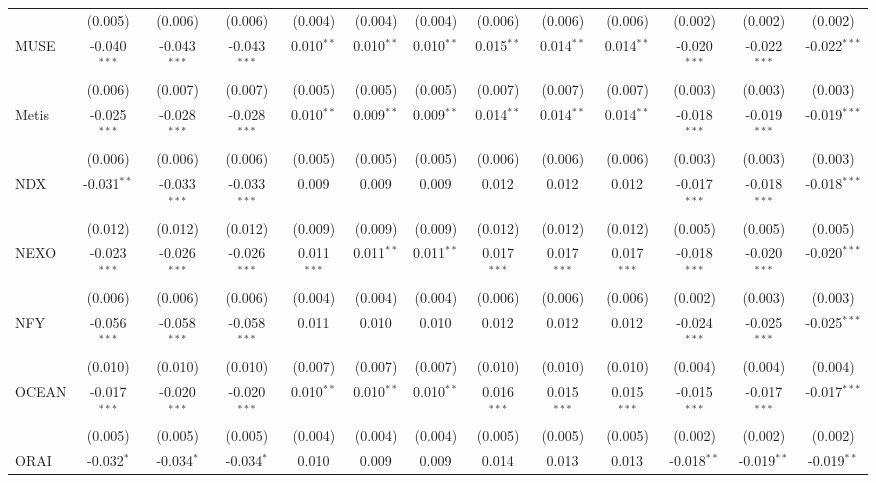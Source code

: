 \begin{table}[!htbp]
\begin{tabular}{@{\extracolsep{5pt}}lcccccccccccc}
  & (0.005) & (0.006) & (0.006) & (0.004) & (0.004) & (0.004) & (0.006) & (0.006) & (0.006) & (0.002) & (0.002) & (0.002) \\
 MUSE & -0.040$^{***}$ & -0.043$^{***}$ & -0.043$^{***}$ & 0.010$^{**}$ & 0.010$^{**}$ & 0.010$^{**}$ & 0.015$^{**}$ & 0.014$^{**}$ & 0.014$^{**}$ & -0.020$^{***}$ & -0.022$^{***}$ & -0.022$^{***}$ \\
  & (0.006) & (0.007) & (0.007) & (0.005) & (0.005) & (0.005) & (0.007) & (0.007) & (0.007) & (0.003) & (0.003) & (0.003) \\
 Metis & -0.025$^{***}$ & -0.028$^{***}$ & -0.028$^{***}$ & 0.010$^{**}$ & 0.009$^{**}$ & 0.009$^{**}$ & 0.014$^{**}$ & 0.014$^{**}$ & 0.014$^{**}$ & -0.018$^{***}$ & -0.019$^{***}$ & -0.019$^{***}$ \\
  & (0.006) & (0.006) & (0.006) & (0.005) & (0.005) & (0.005) & (0.006) & (0.006) & (0.006) & (0.003) & (0.003) & (0.003) \\
 NDX & -0.031$^{**}$ & -0.033$^{***}$ & -0.033$^{***}$ & 0.009$^{}$ & 0.009$^{}$ & 0.009$^{}$ & 0.012$^{}$ & 0.012$^{}$ & 0.012$^{}$ & -0.017$^{***}$ & -0.018$^{***}$ & -0.018$^{***}$ \\
  & (0.012) & (0.012) & (0.012) & (0.009) & (0.009) & (0.009) & (0.012) & (0.012) & (0.012) & (0.005) & (0.005) & (0.005) \\
 NEXO & -0.023$^{***}$ & -0.026$^{***}$ & -0.026$^{***}$ & 0.011$^{***}$ & 0.011$^{**}$ & 0.011$^{**}$ & 0.017$^{***}$ & 0.017$^{***}$ & 0.017$^{***}$ & -0.018$^{***}$ & -0.020$^{***}$ & -0.020$^{***}$ \\
  & (0.006) & (0.006) & (0.006) & (0.004) & (0.004) & (0.004) & (0.006) & (0.006) & (0.006) & (0.002) & (0.003) & (0.003) \\
 NFY & -0.056$^{***}$ & -0.058$^{***}$ & -0.058$^{***}$ & 0.011$^{}$ & 0.010$^{}$ & 0.010$^{}$ & 0.012$^{}$ & 0.012$^{}$ & 0.012$^{}$ & -0.024$^{***}$ & -0.025$^{***}$ & -0.025$^{***}$ \\
  & (0.010) & (0.010) & (0.010) & (0.007) & (0.007) & (0.007) & (0.010) & (0.010) & (0.010) & (0.004) & (0.004) & (0.004) \\
 OCEAN & -0.017$^{***}$ & -0.020$^{***}$ & -0.020$^{***}$ & 0.010$^{**}$ & 0.010$^{**}$ & 0.010$^{**}$ & 0.016$^{***}$ & 0.015$^{***}$ & 0.015$^{***}$ & -0.015$^{***}$ & -0.017$^{***}$ & -0.017$^{***}$ \\
  & (0.005) & (0.005) & (0.005) & (0.004) & (0.004) & (0.004) & (0.005) & (0.005) & (0.005) & (0.002) & (0.002) & (0.002) \\
 ORAI & -0.032$^{*}$ & -0.034$^{*}$ & -0.034$^{*}$ & 0.010$^{}$ & 0.009$^{}$ & 0.009$^{}$ & 0.014$^{}$ & 0.013$^{}$ & 0.013$^{}$ & -0.018$^{**}$ & -0.019$^{**}$ & -0.019$^{**}$ \\

\end{tabular}
\end{table}
